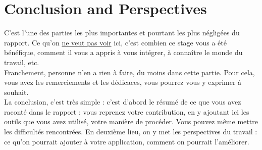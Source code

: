 \chapter{Conclusion and Perspectives}
\pagestyle{fancy}
\fancyhf{}
\fancyhead[R]{\bfseries\rightmark}
\fancyfoot[R]{\thepage}
\renewcommand{\headrulewidth}{0.5pt}
\renewcommand{\footrulewidth}{0pt}
\renewcommand{\chaptermark}[1]{\markboth{\MakeUppercase{\chaptername~\thechapter. #1 }}{}}
\renewcommand{\sectionmark}[1]{\markright{\thechapter.\thesection~ #1}}

\begin{spacing}{1.2}

C'est l'une des parties les plus importantes et pourtant les plus négligées 
du rapport. Ce qu'on \underline{ne veut pas voir} ici, c'est combien ce stage vous a été bénéfique, comment il vous a appris à vous intégrer, à connaître le monde du travail, etc.\\
Franchement, personne n'en a rien à faire, du moins dans cette partie. Pour cela, vous 
avez les remerciements et les dédicaces, vous pourrez vous y exprimer à souhait.\\
La conclusion, c'est très simple : c'est d'abord le résumé de ce que vous avez raconté
dans le rapport : vous reprenez votre contribution, en y ajoutant ici les outils que vous 
avez utilisé, votre manière de procéder. Vous pouvez même mettre les difficultés
rencontrées. En deuxième lieu, on y met les perspectives du travail : ce qu'on pourrait 
ajouter à votre application, comment on pourrait l'améliorer.

\end{spacing}